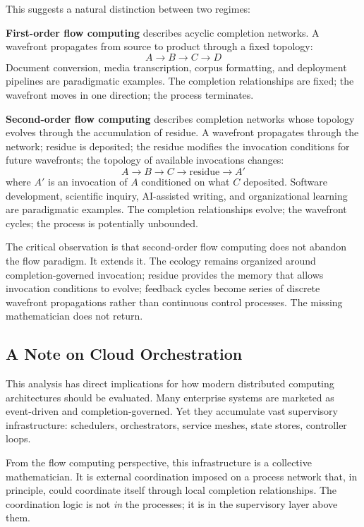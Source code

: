 \documentclass[12pt, a4paper]{article}
\begin{document}
This suggests a natural distinction between two regimes:

\textbf{First-order flow computing} describes acyclic completion
networks. A wavefront propagates from source to product through
a fixed topology:
\[A \to B \to C \to D\]
Document conversion, media transcription, corpus formatting,
and deployment pipelines are paradigmatic examples. The completion
relationships are fixed; the wavefront moves in one direction;
the process terminates.

\textbf{Second-order flow computing} describes completion networks
whose topology evolves through the accumulation of residue. A
wavefront propagates through the network; residue is deposited;
the residue modifies the invocation conditions for future
wavefronts; the topology of available invocations changes:
\[A \to B \to C \to \text{residue} \to A'\]
where $A'$ is an invocation of $A$ conditioned on what $C$
deposited. Software development, scientific inquiry, AI-assisted
writing, and organizational learning are paradigmatic examples.
The completion relationships evolve; the wavefront cycles; the
process is potentially unbounded.

The critical observation is that second-order flow computing does
not abandon the flow paradigm. It extends it. The ecology remains
organized around completion-governed invocation; residue provides
the memory that allows invocation conditions to evolve; feedback
cycles become series of discrete wavefront propagations rather than
continuous control processes. The missing mathematician does not
return.

\subsection{A Note on Cloud Orchestration}

This analysis has direct implications for how modern distributed
computing architectures should be evaluated. Many enterprise systems
are marketed as event-driven and completion-governed. Yet they
accumulate vast supervisory infrastructure: schedulers,
orchestrators, service meshes, state stores, controller loops.

From the flow computing perspective, this infrastructure is a
collective mathematician. It is external coordination imposed on
a process network that, in principle, could coordinate itself
through local completion relationships. The coordination logic is
not \emph{in} the processes; it is in the supervisory layer above
them.
\end{document}
